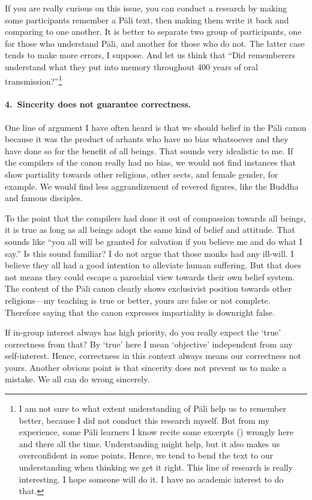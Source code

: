 If you are really curious on this issue, you can conduct a research by making some participants remember a P\=ali text, then making them write it back and comparing to one another. It is better to separate two group of participants, one for those who understand P\=ali, and another for those who do not. The latter case tends to make more errors, I suppose. And let us think that ``Did rememberers understand what they put into memory throughout 400 years of oral transmission?''\footnote{I am not sure to what extent understanding of P\=ali help us to remember better, because I did not conduct this research myself. But from my experience, some P\=ali learners I know recite some excerpts () wrongly here and there all the time. Understanding might help, but it also makes us overconfident in some points. Hence, we tend to bend the text to our understanding when thinking we get it right. This line of research is really interesting. I hope someone will do it. I have no academic interest to do that.}

\paragraph*{4.\ Sincerity does not guarantee correctness.} One line of argument I have often heard is that we should belief in the P\=ali canon because it was the product of arhants who have no bias whatsoever and they have done so for the benefit of all beings. That sounds very idealistic to me. If the compilers of the canon really had no bias, we would not find instances that show partiality towards other religions, other sects, and female gender, for example. We would find less aggrandizement of revered figures, like the Buddha and famous disciples.

To the point that the compilers had done it out of compassion towards all beings, it is true as long as all beings adopt the same kind of belief and attitude. That sounds like ``you all will be granted for salvation if you believe me and do what I say.'' Is this sound familiar? I do not argue that those monks had any ill-will. I believe they all had a good intention to alleviate human suffering. But that does not means they could escape a parochial view towards their own belief system. The content of the P\=ali canon clearly shows exclusivist position towards other religions---my teaching is true or better, yours are false or not complete. Therefore saying that the canon expresses impartiality is downright false.

If in-group interest always has high priority, do you really expect the `true' correctness from that? By `true' here I mean `objective' independent from any self-interest. Hence, correctness in this context always means our correctness not yours. Another obvious point is that sincerity does not prevent us to make a mistake. We all can do wrong sincerely.

